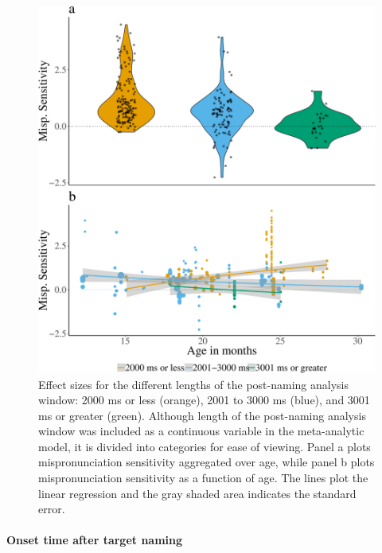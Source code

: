 \documentclass[man]{apa6}
\let\oldparagraph\paragraph
\renewcommand{\paragraph}[1]{\oldparagraph{#1}\mbox{}}
\theoremstyle{definition}
\theoremstyle{definition}
\theoremstyle{definition}
\theoremstyle{remark}
\begin{document}
\begin{figure}
\centering
\includegraphics{VonHolzenBergmann_MPMetaAnalysis_files/figure-latex/Plot-post-name-cond-age-1.pdf}
\caption{\label{fig:Plot-post-name-cond-age}Effect sizes for the different
lengths of the post-naming analysis window: 2000 ms or less (orange),
2001 to 3000 ms (blue), and 3001 ms or greater (green). Although length
of the post-naming analysis window was included as a continuous variable
in the meta-analytic model, it is divided into categories for ease of
viewing. Panel a plots mispronunciation sensitivity aggregated over age,
while panel b plots mispronunciation sensitivity as a function of age.
The lines plot the linear regression and the gray shaded area indicates
the standard error.}
\end{figure}

\paragraph{Onset time after target
naming}\label{onset-time-after-target-naming}
\end{document}
